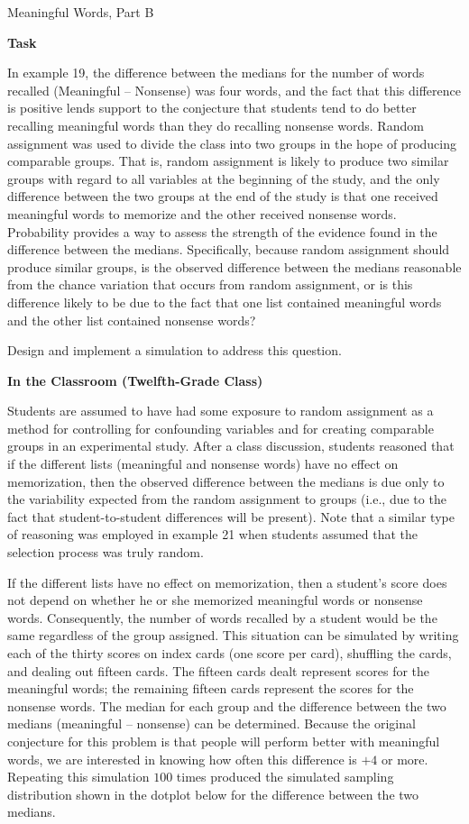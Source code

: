 \documentclass[
  10pt,
  a4paper,
  landscape,
  twoside,
  openany
]{scrbook}
\newcounter{example}
\begin{document}
\TriExample
{Meaningful Words, Part B}
{
\noindent
\textbf{Task}

In example 19, the difference between the medians for the number of words recalled (Meaningful -- Nonsense) was four words, and the fact that this difference is positive lends support to the conjecture that students tend to do better recalling meaningful words than they do recalling nonsense words. Random assignment was used to divide the class into two groups in the hope of producing comparable groups. That is, random assignment is likely to produce two similar groups with regard to all variables at the beginning of the study, and the only difference between the two groups at the end of the study is that one received meaningful words to memorize and the other received nonsense words. Probability provides a way to assess the strength of the evidence found in the difference between the medians. Specifically, because random assignment should produce similar groups, is the observed difference between the medians reasonable from the chance variation that occurs from random assignment, or is this difference likely to be due to the fact that one list contained meaningful words and the other list contained nonsense words? 

Design and implement a simulation to address this question.

\noindent
\textbf{In the Classroom (Twelfth-Grade Class)}

Students are assumed to have had some exposure to random assignment as a method for controlling for confounding variables and for creating comparable groups in an experimental study. After a class discussion, students reasoned that if the different lists (meaningful and nonsense words) have no effect on memorization, then the observed difference between the medians is due only to the variability expected from the random assignment to groups (i.e., due to the fact that student-to-student differences will be present). Note that a similar type of reasoning was employed in example 21 when students assumed that the selection process was truly random.

If the different lists have no effect on memorization, then a student's score does not depend on whether he or she memorized meaningful words or nonsense words. Consequently, the number of words recalled by a student would be the same regardless of the group assigned. This situation can be simulated by writing each of the thirty scores on index cards (one score per card), shuffling the cards, and dealing out fifteen cards. The fifteen cards dealt represent scores for the meaningful words; the remaining fifteen cards represent the scores for the nonsense words. The median for each group and the difference between the two medians (meaningful -- nonsense) can be determined. Because the original conjecture for this problem is that people will perform better with meaningful words, we are interested in knowing how often this difference is $+4$ or more. Repeating this simulation $100$ times produced the simulated sampling distribution shown in the dotplot below for the difference between the two medians.

}
\end{document}
